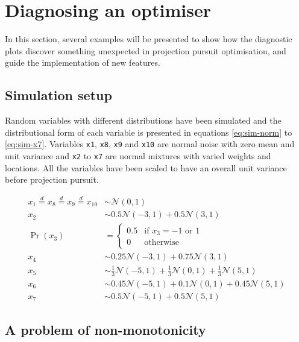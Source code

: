 \hypertarget{application}{%
\section{Diagnosing an optimiser}\label{application}}

In this section, several examples will be presented to show how the
diagnostic plots discover something unexpected in projection pursuit
optimisation, and guide the implementation of new features.

\hypertarget{simulation-setup}{%
\subsection{Simulation setup}\label{simulation-setup}}

Random variables with different distributions have been simulated and
the distributional form of each variable is presented in equations
\ref{eq:sim-norm} to \ref{eq:sim-x7}. Variables \texttt{x1},
\texttt{x8}, \texttt{x9} and \texttt{x10} are normal noise with zero
mean and unit variance and \texttt{x2} to \texttt{x7} are normal
mixtures with varied weights and locations. All the variables have been
scaled to have an overall unit variance before projection pursuit.

\begin{align}
x_1 \overset{d}{=} x_8 \overset{d}{=} x_9 \overset{d}{=} x_{10}& \sim \mathcal{N}(0, 1) \label{eq:sim-norm} \\
x_2 &\sim 0.5 \mathcal{N}(-3, 1) + 0.5 \mathcal{N}(3, 1)\label{eq:sim-x2}\\
\Pr(x_3) &= 
\begin{cases}
0.5 & \text{if $x_3 = -1$ or $1$}\\
0 & \text{otherwise}
\end{cases}\label{eq:sim-x3}\\
x_4 &\sim 0.25 \mathcal{N}(-3, 1) + 0.75 \mathcal{N}(3, 1) \label{eq:sim-x4}\\
x_5 &\sim \frac{1}{3} \mathcal{N}(-5, 1) + \frac{1}{3} \mathcal{N}(0, 1) + \frac{1}{3} \mathcal{N}(5, 1)\label{eq:sim-x5}\\
x_6 &\sim 0.45 \mathcal{N}(-5, 1) + 0.1 \mathcal{N}(0, 1) + 0.45 \mathcal{N}(5, 1)\label{eq:sim-x6}\\
x_7 &\sim 0.5 \mathcal{N}(-5, 1) + 0.5 \mathcal{N}(5, 1) 
\label{eq:sim-x7}
\end{align}

\hypertarget{monotonic}{%
\subsection{A problem of non-monotonicity}\label{monotonic}}

